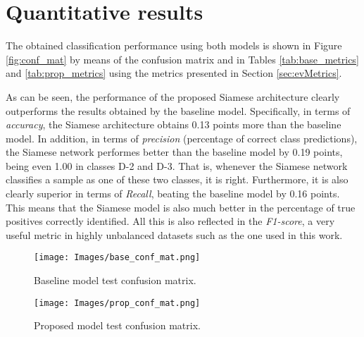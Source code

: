 \section{Quantitative results}
\label{sec:quant_results}

The obtained classification performance using both models is shown in Figure \ref{fig:conf_mat} by means of the confusion matrix and in Tables \ref{tab:base_metrics} and \ref{tab:prop_metrics} using the metrics presented in Section \ref{sec:evMetrics}. 

As can be seen, the performance of the proposed Siamese architecture clearly outperforms the results obtained by the baseline model. Specifically, in terms of \emph{accuracy}, the Siamese architecture obtains 0.13 points more than the baseline model. In addition, in terms of \emph{precision} (percentage of correct class predictions), the Siamese network performes better than the baseline model by 0.19 points, being even 1.00 in classes D-2 and D-3. That is, whenever the Siamese network classifies a sample as one of these two classes, it is right. Furthermore, it is also clearly superior in terms of \emph{Recall}, beating the baseline model by 0.16 points. This means that the Siamese model is also much better in the percentage of true positives correctly identified. All this is also reflected in the \emph{F1-score}, a very useful metric in highly unbalanced datasets such as the one used in this work.

\begin{figure*}[h!]
        \centering
        \begin{subfigure}[b]{0.49\textwidth}
        \centering
            \texttt{[image: Images/base\_conf\_mat.png]}
             \caption[Baseline model test confusion matrix.]
            {\small Baseline model test confusion matrix.}   
            \label{fig:base_conf_mat}
        \end{subfigure}
        \hfill
        \begin{subfigure}[b]{0.49\textwidth}  
        \centering
            \texttt{[image: Images/prop\_conf\_mat.png]}
             \caption[Proposed model test confusion matrix.]
            {\small Proposed model test confusion matrix.}   
            \label{fig:prop_conf_mat}
        \end{subfigure}
        \caption[Test confusion matrices.]
        {\small Test confusion matrices.}    
        \label{fig:conf_mat}
    \end{figure*}

